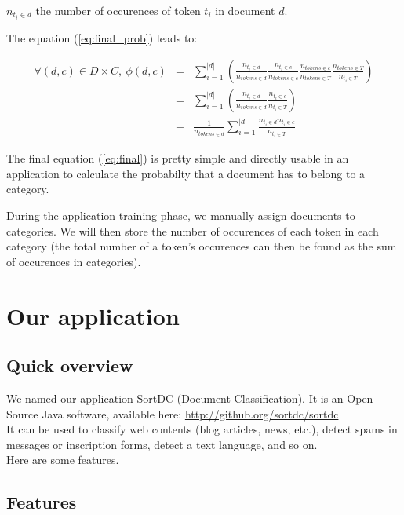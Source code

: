 \documentclass[a4paper,11pt]{article}
\begin{document}
$n_{t_i \in d}$ the number of occurences of token $t_i$ in document $d$.

The equation (\ref{eq:final_prob}) leads to:

\begin{eqnarray}\label{eq:final}
    \forall (d, c) \in D \times C,\ 
    \phi(d, c)
    &=& \sum_{i=1}^{|d|} (
        \frac{n_{t_i \in d}}{n_{tokens \in d}}
        \frac{n_{t_i \in c}}{n_{tokens \in c}}
        \frac{n_{tokens \in c}}{n_{tokens \in T}}
        \frac{n_{tokens \in T}}{n_{t_i \in T}}
    ) \nonumber \\
    &=& \sum_{i=1}^{|d|} (
        \frac{n_{t_i \in d}}{n_{tokens \in d}}
        \frac{n_{t_i \in c}}{n_{t_i \in T}}
    ) \nonumber \\
    &=& \frac{1}{n_{tokens \in d}}
        \sum_{i=1}^{|d|}
        \frac{n_{t_i \in d} n_{t_i \in c}}{n_{t_i \in T}}
\end{eqnarray}

The final equation (\ref{eq:final}) is pretty simple and directly usable in
an application to calculate the probabilty that a document has to belong to
a category.

During the application training phase, we manually assign documents to
categories. We will then store the number of occurences of each token in each
category (the total number of a token's occurences can then be found as the
sum of occurences in categories).

\section{Our application}

\subsection{Quick overview}

We named our application SortDC (Document Classification). It is an Open Source
Java software, available here: \url{http://github.org/sortdc/sortdc}\\
It can be used to classify web contents (blog articles, news, etc.), detect
spams in messages or inscription forms, detect a text language, and so on.\\
Here are some features.

\subsection{Features}
\end{document}
